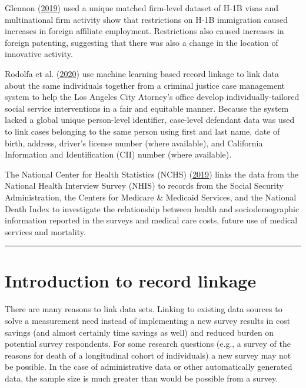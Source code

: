 \documentclass[]{krantz}
\begin{document}
Glennon (\protect\hyperlink{ref-Glennon2019}{2019}) used a unique
matched firm-level dataset of H-1B visas and multinational firm activity
show that restrictions on H-1B immigration caused increases in foreign
affiliate employment. Restrictions also caused increases in foreign
patenting, suggesting that there was also a change in the location of
innovative activity.

Rodolfa et al. (\protect\hyperlink{ref-Rodolfa2020}{2020}) use machine
learning based record linkage to link data about the same individuals
together from a criminal justice case management system to help the Los
Angeles City Atorney's office develop individually-tailored social
service interventions in a fair and equitable manner. Because the system
lacked a global unique person-level identifier, case-level defendant
data was used to link cases belonging to the same person using first and
last name, date of birth, address, driver's license number (where
available), and California Information and Identification (CII) number
(where available).

The National Center for Health Statistics (NCHS)
(\protect\hyperlink{ref-NCHS2019}{2019}) links the data from the
National Health Interview Survey (NHIS) to records from the Social
Security Administration, the Centers for Medicare \& Medicaid Services,
and the National Death Index to investigate the relationship between
health and sociodemographic information reported in the surveys and
medical care costs, future use of medical services and mortality.

\begin{center}\rule{0.5\linewidth}{\linethickness}\end{center}

\section{Introduction to record linkage}\label{sec:recordlinkage}

There are many reasons to link data sets. Linking to existing data
sources to solve a measurement need instead of implementing a new survey
results in cost savings (and almost certainly time savings as well) and
reduced burden on potential survey respondents. For some research
questions (e.g., a survey of the reasons for death of a longitudinal
cohort of individuals) a new survey may not be possible. In the case of
administrative data or other automatically generated data, the sample
size is much greater than would be possible from a survey.
\end{document}
